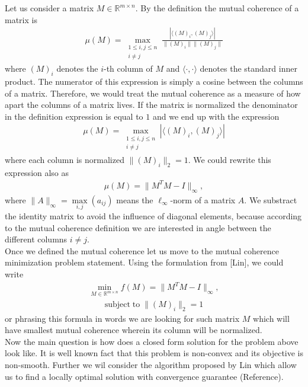 \documentclass[journal]{IEEEtran}
\begin{document}
Let us consider a matrix $ M\in \mathbb{ R}^{m\times n}$. By the definition the mutual coherence of a matrix is
\begin{align}
\mu(M)=\max\limits_{\substack{1\leq i,j \leq n \\ i\neq j}}\frac{|\langle (M)_i, (M)_j \rangle |}{\|(M)_i\| \|(M)_j\|}
\end{align}
where $ (M)_i$ denotes the $i$-th column of $M$ and $\langle\cdot , \cdot \rangle $ denotes the standard inner product. The numerator of this expression is simply a cosine between the columns of a matrix. Therefore, we would treat the mutual coherence as a measure of how apart the columns of a matrix lives.  If the matrix is normalized the denominator in the definition expression is equal to $1$ and we end up with  the expression
\begin{align}
\mu(M)=\max\limits_{\substack{1\leq i,j \leq n \\ i\neq j}}|\langle (M)_i, (M)_j \rangle |
\end{align}
where each column is normalized $ \|(M)_i\|_2=1$.  We could rewrite this expression also as
\begin{align}
\mu(M)=\|M^TM-I\|_{\infty},
\end{align}
where $\|A \|_{\infty}=\max\limits_{i,j}(a_{ij})$ means the $\ell_{\infty}$-norm of a matrix $A$. We substract the identity matrix to avoid the influence of diagonal elements, because according to the mutual coherence definition we are interested in angle between the different columns $i\neq j$. \\
Once we defined the mutual coherence let us move to the mutual coherence minimization problem statement.  Using the formulation from [Lin], we could write
\begin{align}
\min_{M\in\mathbb{R}^{m\times n}}f(M)=\|M^TM-I\|_{\infty},
\end{align}
\begin{align}
\textrm{subject}\;\textrm{to} \;\|(M)_i\|_2=1
\end{align}
or phrasing this formula  in words we are looking for such matrix $M$ which will have smallest mutual coherence wherein its column will be normalized. \\
Now the main question is how does a closed form solution for the problem above look like. It is well known fact that this problem is non-convex and its objective is non-smooth. Further we wil consider the algorithm proposed by Lin which allow us to find a locally optimal solution with convergence guarantee (Reference). \\
\end{document}
